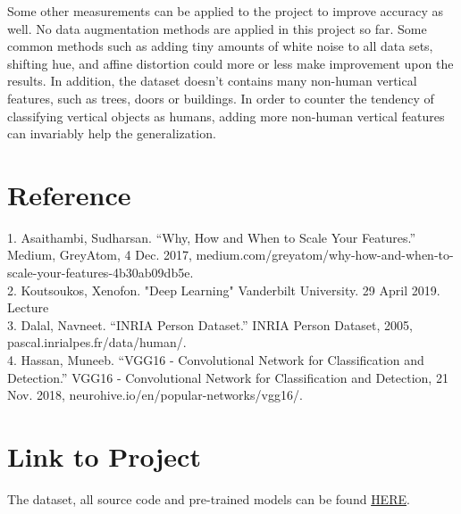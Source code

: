 \documentclass[twocolumn, 12pt]{article}
\begin{document}
Some other measurements can be applied to the project to improve accuracy as well. No data augmentation methods are applied in this project so far. Some common methods such as adding tiny amounts of white noise to all data sets, shifting hue, and affine distortion could more or less make improvement upon the results. In addition, the dataset doesn't contains many non-human vertical features, such as trees, doors or buildings. In order to counter the tendency of classifying vertical objects as humans, adding more non-human vertical features can invariably help the generalization.

\section{Reference}
1. Asaithambi, Sudharsan. “Why, How and When to Scale Your Features.” Medium, GreyAtom, 4 Dec. 2017, medium.com/greyatom/why-how-and-when-to-scale-your-features-4b30ab09db5e.\\

2. Koutsoukos, Xenofon. "Deep Learning" Vanderbilt University. 29 April 2019. Lecture\\

3. Dalal, Navneet. “INRIA Person Dataset.” INRIA Person Dataset, 2005, pascal.inrialpes.fr/data/human/.\\

4. Hassan, Muneeb. “VGG16 - Convolutional Network for Classification and Detection.” VGG16 - Convolutional Network for Classification and Detection, 21 Nov. 2018, neurohive.io/en/popular-networks/vgg16/.
\section{Link to Project}
The dataset, all source code and pre-trained models can be found \href{https://github.com/Ebonyknigh/DLHumanDetection}{HERE}.
\end{document}
